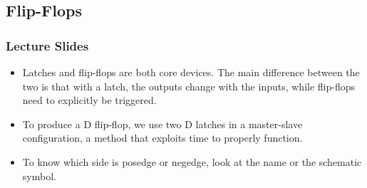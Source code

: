 \documentclass[10pt,a4paper]{article}
\begin{document}
\subsection{Flip-Flops}
\subsubsection{Lecture Slides}
\begin{itemize}
\item Latches and flip-flops are both core devices. The main difference between the two is that with a latch, the outputs change with the inputs, while flip-flops need to explicitly be triggered.
\item To produce a D flip-flop, we use two D latches in a master-slave configuration, a method that exploits time to properly function.
\item To know which side is posedge or negedge, look at the name or the schematic symbol.
\end{itemize}
\end{document}
